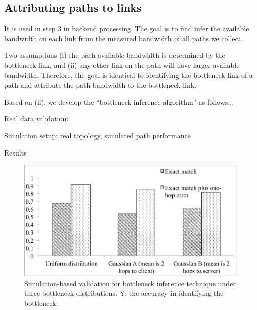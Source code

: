 \subsection{Attributing paths to links}
\begin{packeditemize}
	\item It is used in step 3 in backend processing. The goal is to find infer the available bandwidth on each link from the measured bandwidth of all paths we collect.
	\item Two assumptions (i) the path available bandwidth is determined by the bottleneck link, and (ii) any other link on the path will have larger available bandwidth. Therefore, the goal is identical to identifying the bottleneck link of a path and attribute the path bandwidth to the bottleneck link.
	\item Based on (ii), we develop the ``bottleneck inference algorithm'' as follows...
	\item Real data validation:
		\begin{packeditemize}
			\item Simulation setup: real topology, simulated path performance
			\item Results
		\end{packeditemize}
\end{packeditemize}

\begin{figure}[h]
\begin{center}
\includegraphics[scale=0.4] {figures/bottle-sim-bar.pdf}
\caption{Simulation-based validation for bottleneck inference technique under three bottleneck distributions. Y: the accuracy in identifying the bottleneck.}
\label{fig:idea:simulation1}
\end{center}
\end{figure}


